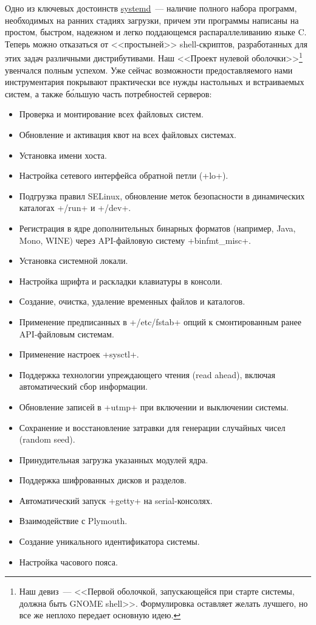 \documentclass[10pt,oneside,a4paper]{article}
\begin{document}
Одно из ключевых достоинств
\href{http://www.freedesktop.org/wiki/Software/systemd}{systemd}~--- наличие
полного набора программ, необходимых на ранних стадиях загрузки, причем эти
программы написаны на простом, быстром, надежном и легко поддающемся
распараллеливанию языке C. Теперь можно отказаться от <<простыней>>
shell-скриптов, разработанных для этих задач различными дистрибутивами. Наш
<<Проект нулевой оболочки>>\footnote{Наш девиз~--- <<Первой оболочкой,
запускающейся при старте системы, должна быть GNOME shell>>. Формулировка
оставляет желать лучшего, но все же неплохо передает основную идею.} увенчался
полным успехом. Уже сейчас возможности предоставляемого нами инструментария
покрывают практически все нужды настольных и встраиваемых систем, а также
б\'{о}льшую часть потребностей серверов:
\begin{itemize}
	\item Проверка и монтирование всех файловых систем.
	\item Обновление и активация квот на всех файловых системах.
	\item Установка имени хоста.
	\item Настройка сетевого интерфейса обратной петли (+lo+).
	\item Подгрузка правил SELinux, обновление
		меток безопасности в динамических каталогах +/run+ и +/dev+.
	\item Регистрация в ядре дополнительных бинарных форматов (например,
		Java, Mono, WINE) через API-файловую систему +binfmt_misc+.
	\item Установка системной локали.
	\item Настройка шрифта и раскладки клавиатуры в консоли.
	\item Создание, очистка, удаление временных файлов и каталогов.
	\item Применение предписанных в +/etc/fstab+ опций к смонтированным
		ранее API-файловым системам.
	\item Применение настроек +sysctl+.
	\item Поддержка технологии упреждающего чтения (read ahead), включая
		автоматический сбор информации.
	\item Обновление записей в +utmp+ при включении и выключении системы.
	\item Сохранение и восстановление затравки для генерации случайных чисел
		(random seed).
	\item Принудительная загрузка указанных модулей ядра.
	\item Поддержка шифрованных дисков и разделов.
	\item Автоматический запуск +getty+ на serial-консолях.
	\item Взаимодействие с Plymouth.
	\item Создание уникального идентификатора системы.
	\item Настройка часового пояса.
\end{itemize}
\end{document}
